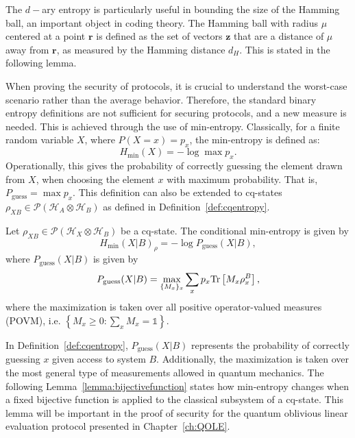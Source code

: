 The $d-$ary entropy is particularly useful in bounding the size of the Hamming ball, an important object in coding theory. The Hamming ball with radius $\mu$ centered at a point $\bm{r}$ is defined as the set of vectors $\bm{z}$ that are a distance of $\mu$ away from $\bm{r}$, as measured by the Hamming distance $d_H$. This is stated in the following lemma.

When proving the security of protocols, it is crucial to understand the worst-case scenario rather than the average behavior. Therefore, the standard binary entropy definitions are not sufficient for securing protocols, and a new measure is needed. This is achieved through the use of min-entropy. Classically, for a finite random variable $X$, where $P(X=x) = p_x$, the min-entropy is defined as:
$$H_{\min}(X) = -\log \max p_x.$$
Operationally, this gives the probability of correctly guessing the element drawn from $X$, when choosing the element $x$ with maximum probability. That is, $P_{\text{guess}} = \max p_x$. This definition can also be extended to cq-states $\rho_{XB}\in\mathcal{P}(\mathcal{H}_A \otimes \mathcal{H}_B)$ as defined in Definition~\ref{def:cqentropy}.

\begin{definition}
\label{def:cqentropy}
Let $\rho_{X B}\in\mathcal{P}(\mathcal{H}_X \otimes \mathcal{H}_{B})$ be a cq-state. The conditional min-entropy is given by
$$H_{\min}(X|B)_{\rho} = -\log P_{\text{guess}}(X|B),$$
where $P_{\text{guess}}(X|B)$ is given by
$$P_{\text{guess}}(X|B) = \max_{\{M_x\}_x} \sum_x p_x \text{Tr}\left[M_x \rho_{x}^B\right],$$
where the maximization is taken over all positive operator-valued measures (POVM), i.e. $\left\{ M_x \geq 0 : \sum_x M_x = \mathds{1} \right\}$.
\end{definition}

In Definition~\ref{def:cqentropy}, $P_{\text{guess}}(X|B)$ represents the probability of correctly guessing $x$ given access to system $B$. Additionally, the maximization is taken over the most general type of measurements allowed in quantum mechanics. The following Lemma~\ref{lemma:bijectivefunction} states how min-entropy changes when a fixed bijective function is applied to the classical subsystem of a cq-state. This lemma will be important in the proof of security for the quantum oblivious linear evaluation protocol presented in Chapter~\ref{ch:QOLE}.

